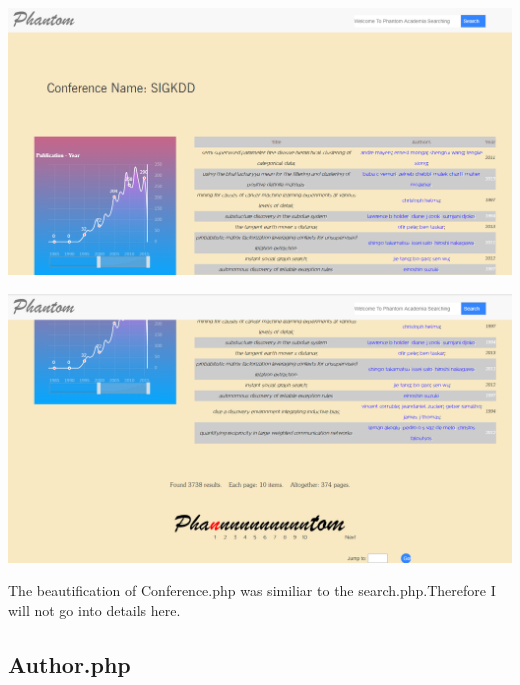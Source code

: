 \documentclass[10pt,twoside,a4paper,titlepage]{article}
\begin{document}
 \hspace*{\fill} 
\begin{flushleft}
	\includegraphics[width=1.0\textwidth]{cyf/Conference.PNG}
	\newline
	
	\includegraphics[width=1.0\textwidth]{cyf/Conference2.PNG}
\end{flushleft}

	The beautification of Conference.php was similiar to the search.php.Therefore I will not go into details here.
	
	\subsection{Author.php}
	
\end{document}

